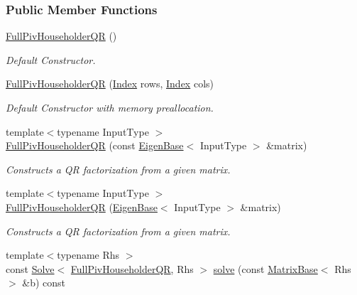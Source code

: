 \subsubsection*{Public Member Functions}
\begin{DoxyCompactItemize}
\item 
\hyperlink{group___q_r___module_aeb14b4c1eef33128207b40a00bd0bd08}{Full\+Piv\+Householder\+QR} ()
\begin{DoxyCompactList}\small\item\em Default Constructor. \end{DoxyCompactList}\item 
\hyperlink{group___q_r___module_abf722e1dc7241a5d6f76460ef0c87821}{Full\+Piv\+Householder\+QR} (\hyperlink{namespace_eigen_a62e77e0933482dafde8fe197d9a2cfde}{Index} rows, \hyperlink{namespace_eigen_a62e77e0933482dafde8fe197d9a2cfde}{Index} cols)
\begin{DoxyCompactList}\small\item\em Default Constructor with memory preallocation. \end{DoxyCompactList}\item 
{\footnotesize template$<$typename Input\+Type $>$ }\\\hyperlink{group___q_r___module_aeeace3abca6b215025e94c3e098b0a97}{Full\+Piv\+Householder\+QR} (const \hyperlink{group___core___module_struct_eigen_1_1_eigen_base}{Eigen\+Base}$<$ Input\+Type $>$ \&matrix)
\begin{DoxyCompactList}\small\item\em Constructs a QR factorization from a given matrix. \end{DoxyCompactList}\item 
{\footnotesize template$<$typename Input\+Type $>$ }\\\hyperlink{group___q_r___module_ac9bdb4f7fa77c1aa16f238592c248e70}{Full\+Piv\+Householder\+QR} (\hyperlink{group___core___module_struct_eigen_1_1_eigen_base}{Eigen\+Base}$<$ Input\+Type $>$ \&matrix)
\begin{DoxyCompactList}\small\item\em Constructs a QR factorization from a given matrix. \end{DoxyCompactList}\item 
{\footnotesize template$<$typename Rhs $>$ }\\const \hyperlink{group___core___module_class_eigen_1_1_solve}{Solve}$<$ \hyperlink{group___q_r___module_class_eigen_1_1_full_piv_householder_q_r}{Full\+Piv\+Householder\+QR}, Rhs $>$ \hyperlink{group___q_r___module_a6f1b0a116c78e642e3d2a100a29d1a4a}{solve} (const \hyperlink{group___core___module_class_eigen_1_1_matrix_base}{Matrix\+Base}$<$ Rhs $>$ \&b) const

\end{DoxyCompactItemize}
